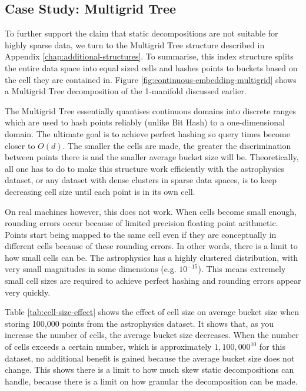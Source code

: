 \subsection{Case Study: Multigrid Tree}

To further support the claim that static decompositions are not suitable for highly sparse data, we turn to the Multigrid Tree structure described in Appendix \ref{chap:additional-structures}. To summarise, this index structure splits the entire data space into equal sized cells and hashes points to buckets based on the cell they are contained in. Figure \ref{fig:continuous-embedding-multigrid} shows a Multigrid Tree decomposition of the 1-manifold discussed earlier.

The Multigrid Tree essentially quantises continuous domains into discrete ranges which are used to hash points reliably (unlike Bit Hash) to a one-dimensional domain. The ultimate goal is to achieve perfect hashing so query times become closer to $O(d)$. The smaller the cells are made, the greater the discrimination between points there is and the smaller average bucket size will be. Theoretically, all one has to do to make this structure work efficiently with the astrophysics dataset, or any dataset with dense clusters in sparse data spaces, is to keep decreasing cell size until each point is in its own cell.

On real machines however, this does not work. When cells become small enough, rounding errors occur because of limited precision floating point arithmetic. Points start being mapped to the same cell even if they are conceptually in different cells because of these rounding errors. In other words, there is a limit to how small cells can be. The astrophysics has a highly clustered distribution, with very small magnitudes in some dimensions (e.g. $10^{-15}$). This means extremely small cell sizes are required to achieve perfect hashing and rounding errors appear very quickly.

Table \ref{tab:cell-size-effect} shows the effect of cell size on average bucket size when storing 100,000 points from the astrophysics dataset. It shows that, as you increase the number of cells, the average bucket size decreases. When the number of cells exceeds a certain number, which is approximately $1,100,000^{10}$ for this dataset, no additional benefit is gained because the average bucket size does not change.  This shows there is a limit to how much skew static decompositions can handle, because there is a limit on how granular the decomposition can be made.	
	
